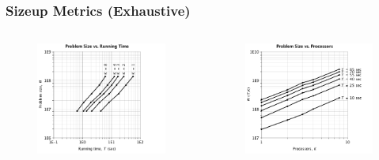 \documentclass[handout,10pt]{beamer}
\begin{document}
\begin{frame}
	\frametitle{Sizeup Metrics (Exhaustive)}
\begin{columns}
	\vspace{-1em}
	\begin{figure}
	\centering
	\includegraphics[scale = 0.25]{ge_size_4.png}
	\end{figure}
	\vspace{-2em}
	\begin{figure}
	\centering
	\includegraphics[scale = 0.25]{ge_size_3.png}
	\end{figure}
\begin{minipage}[c][.6\textheight][c]{\linewidth}
	\vspace{-1em}

\end{minipage}
\end{columns}
\end{frame}
\end{document}
